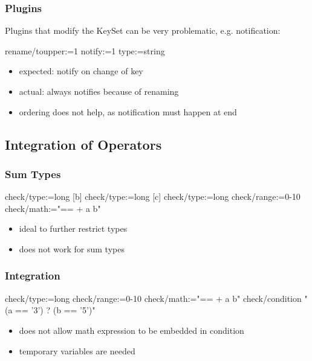 \begin{frame}[fragile]
	\frametitle{Plugins}

	Plugins that modify the KeySet can be very problematic, e.g. notification:
	\begin{code}
	  rename/toupper:=1
	  notify:=1
	  type:=string
	\end{code}

	\begin{itemize}
	\item expected: notify on change of key
	\item actual: always notifies because of renaming
	\item ordering does not help, as notification must happen at end
	\end{itemize}
\end{frame}

\subsection{Integration of Operators}

\begin{frame}
	\frametitle{Sum Types}

	\begin{code}[morekeywords={check,type,range,math},gobble=4]
	[a]
	  check/type:=long
	[b]
	  check/type:=long
	[c]
	  check/type:=long
	  check/range:=0-10
	  check/math:="== + a b"
	\end{code}

	\begin{itemize}
	\item ideal to further restrict types
	\item does not work for sum types
	\end{itemize}
\end{frame}

\begin{frame}
	\frametitle{Integration}

	\begin{code}[morekeywords={check,type,range,math},gobble=4]
	[c]
	  check/type:=long
	  check/range:=0-10
	  check/math:="== + a b"
	  check/condition "(a == '3') ? (b == '5')"
	\end{code}

	\begin{itemize}
	\item does not allow math expression to be embedded in condition
	\item temporary variables are needed
	\end{itemize}
\end{frame}


